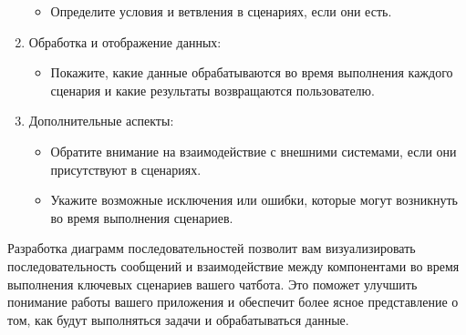 \documentclass[letterpaper,10pt,russian]{sphinxmanual}
\begin{document}
\begin{enumerate}
\begin{itemize}
\item {} 
\sphinxAtStartPar
Определите условия и ветвления в сценариях, если они есть.

\end{itemize}

\item {} 
\sphinxAtStartPar
Обработка и отображение данных:
\begin{itemize}
\item {} 
\sphinxAtStartPar
Покажите, какие данные обрабатываются во время выполнения каждого сценария и какие результаты возвращаются пользователю.

\end{itemize}

\item {} 
\sphinxAtStartPar
Дополнительные аспекты:
\begin{itemize}
\item {} 
\sphinxAtStartPar
Обратите внимание на взаимодействие с внешними системами, если они присутствуют в сценариях.

\item {} 
\sphinxAtStartPar
Укажите возможные исключения или ошибки, которые могут возникнуть во время выполнения сценариев.

\end{itemize}

\end{enumerate}

\sphinxAtStartPar
Разработка диаграмм последовательностей позволит вам визуализировать последовательность сообщений и взаимодействие между компонентами во время выполнения ключевых сценариев вашего чат\sphinxhyphen{}бота. Это поможет улучшить понимание работы вашего приложения и обеспечит более ясное представление о том, как будут выполняться задачи и обрабатываться данные.
\end{document}
